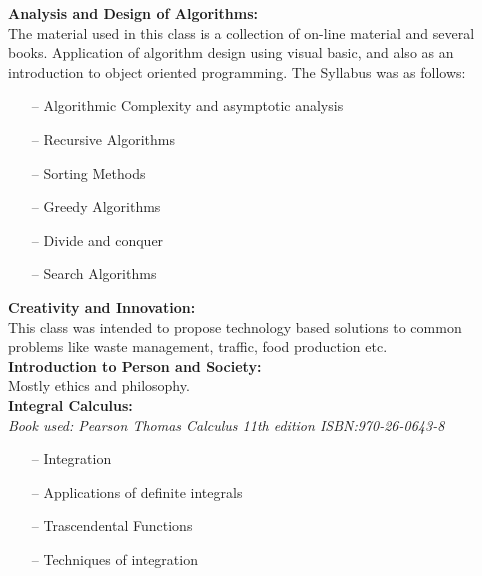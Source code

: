 \documentclass{article}
\begin{document}
\textbf{Analysis and Design of Algorithms:}\\
    The material used in this class is a collection of on-line material and several books.
    Application of algorithm design using visual basic, and also as an introduction
    to object oriented programming. The Syllabus was as follows:
    \begin{itemize}
     \setlength\itemsep{0pt}
        \item[--] Algorithmic Complexity and asymptotic analysis
        \item[--] Recursive Algorithms
        \item[--] Sorting Methods
        \item[--] Greedy Algorithms
        \item[--] Divide and conquer
        \item[--] Search Algorithms
    \end{itemize}

\textbf{Creativity and Innovation:}\\
    This class was intended to propose technology based solutions to common problems
    like waste management, traffic, food production etc.\\


\textbf{Introduction to Person and Society:}\\
    Mostly ethics and philosophy. \\

\textbf{Integral Calculus:}\\
    \emph{Book used: Pearson Thomas Calculus 11th edition ISBN:970-26-0643-8}
  \begin{itemize}
     \setlength\itemsep{0pt}
      \item[--] Integration
      \item[--] Applications of definite integrals
      \item[--] Trascendental Functions
      \item[--] Techniques of integration
  \end{itemize}
\end{document}
